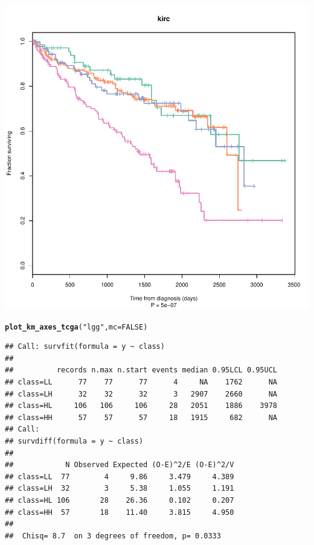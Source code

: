 \documentclass{article}\usepackage[]{graphicx}\usepackage[]{color}
\makeatletter
\def\maxwidth{ %
  \ifdim\Gin@nat@width>\linewidth
    \linewidth
  \else
    \Gin@nat@width
  \fi
}
\newcommand{\hlnum}[1]{\textcolor[rgb]{0.686,0.059,0.569}{#1}}%
\newcommand{\hlstr}[1]{\textcolor[rgb]{0.192,0.494,0.8}{#1}}%
\newcommand{\hlstd}[1]{\textcolor[rgb]{0.345,0.345,0.345}{#1}}%
\newcommand{\hlkwc}[1]{\textcolor[rgb]{0.333,0.667,0.333}{#1}}%
\newcommand{\hlkwd}[1]{\textcolor[rgb]{0.737,0.353,0.396}{\textbf{#1}}}%
\newenvironment{kframe}{%
 \def\at@end@of@kframe{}%
 \ifinner\ifhmode%
  \def\at@end@of@kframe{\end{minipage}}%
  \begin{minipage}{\columnwidth}%
 \fi\fi%
 \def\FrameCommand##1{\hskip\@totalleftmargin \hskip-\fboxsep
 \colorbox{shadecolor}{##1}\hskip-\fboxsep
     \hskip-\linewidth \hskip-\@totalleftmargin \hskip\columnwidth}%
 \MakeFramed {\advance\hsize-\width
   \@totalleftmargin\z@ \linewidth\hsize
   \@setminipage}}%
 {\par\unskip\endMakeFramed%
 \at@end@of@kframe}
\newenvironment{knitrout}{}{} %
\makeatother
\begin{document}
\begin{knitrout}
{\centering \includegraphics[width=\maxwidth]{figure/km-curves-10} 

}


\begin{kframe}\begin{alltt}
\hlkwd{plot_km_axes_tcga}\hlstd{(}\hlstr{"lgg"}\hlstd{,} \hlkwc{mc} \hlstd{=} \hlnum{FALSE}\hlstd{)}
\end{alltt}


{\ttfamily\noindent{}}\begin{verbatim}
## Call: survfit(formula = y ~ class)
## 
##          records n.max n.start events median 0.95LCL 0.95UCL
## class=LL      77    77      77      4     NA    1762      NA
## class=LH      32    32      32      3   2907    2660      NA
## class=HL     106   106     106     28   2051    1886    3978
## class=HH      57    57      57     18   1915     682      NA
## Call:
## survdiff(formula = y ~ class)
## 
##            N Observed Expected (O-E)^2/E (O-E)^2/V
## class=LL  77        4     9.86     3.479     4.389
## class=LH  32        3     5.38     1.055     1.191
## class=HL 106       28    26.36     0.102     0.207
## class=HH  57       18    11.40     3.815     4.950
## 
##  Chisq= 8.7  on 3 degrees of freedom, p= 0.0333
\end{verbatim}
\end{kframe}


\end{knitrout}
\end{document}
